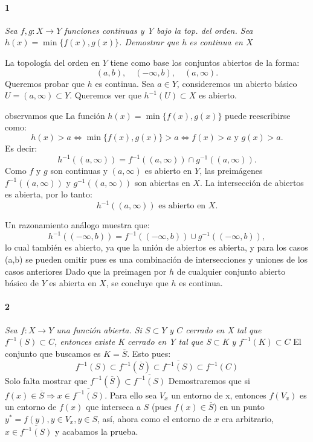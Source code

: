 \documentclass[12pt]{article}
\author{Alumnos: \\Arturo Rodriguez Contreras - 2132880 \\
Jonathan Raymundo Torres Cardenas - 1949731\\
Praxedis Jimenes Ruvalcaba \\
Erick Román Montemayor Treviño - 1957959 \\
Alexis Noe Mora Leyva \\
Everardo Flores Rivera - 2127301}
\begin{document}
\maketitle

\paragraph{1}
\textit{Sea $f,g:X \to Y$ funciones continuas y Y bajo la top. del orden. Sea $h(x)=\min{\{f(x),g(x)\}}$. Demostrar que h es continua en $X$}

La topología del orden en \( Y \) tiene como base los conjuntos abiertos de la forma:
\[
(a, b),\quad (-\infty, b),\quad (a, \infty).
\]
Queremos probar que \( h \) es continua.  
Sea \( a \in Y \), consideremos un abierto básico \( U = (a, \infty) \subset Y \).  
Queremos ver que \( h^{-1}(U) \subset X \) es abierto.

observamos que
La función \( h(x) = \min\{f(x), g(x)\} \) puede reescribirse como:
\[
h(x) > a \iff \min\{f(x), g(x)\} > a \iff f(x) > a \text{ y } g(x) > a.
\]
Es decir:
\[
h^{-1}((a, \infty)) = f^{-1}((a, \infty)) \cap g^{-1}((a, \infty)).
\]
Como \( f \) y \( g \) son continuas y \( (a, \infty) \) es abierto en \( Y \), las preimágenes \( f^{-1}((a, \infty)) \) y \( g^{-1}((a, \infty)) \) son abiertas en \( X \).  
La intersección de abiertos es abierta, por lo tanto:
\[
h^{-1}((a, \infty)) \text{ es abierto en } X.
\]

Un razonamiento análogo muestra que:
\[
h^{-1}((-\infty, b)) = f^{-1}((-\infty, b)) \cup g^{-1}((-\infty, b)),
\]
lo cual también es abierto, ya que la unión de abiertos es abierta, y para los casos  (a,b) se pueden omitir pues es una combinación de intersecciones y uniones de los casos anteriores    
Dado que la preimagen por \( h \) de cualquier conjunto abierto básico de \( Y \) es abierta en \( X \), se concluye que \( h \) es continua.

\paragraph{2}
\textit{Sea $f:X\rightarrow Y$ una función abierta. Si $S \subset Y$ y $C$ cerrado en X tal que $f^{-1}(S)\subset C$, entonces existe K cerrado en Y tal que S$\subset$K y $f^{-1}(K)\subset C$}
El conjunto que buscamos es $K=\overline{S}$. Esto pues:
\begin{equation}
    f^{-1}(S) \subset f^{-1}(\overline{S}) \subset \overline{f^{-1}(S)} \subset f^{-1}(C)
\end{equation}
Solo falta mostrar que $f^{-1}(\overline{S}) \subset \overline{f^{-1}(S)}$
Demostraremos que si $f(x) \in \overline{S} \Rightarrow x \in \overline{f^{-1}(S)}$. Para ello sea $V_{x}$ un entorno de x, entonces $f(V_{x})$ es un entorno de $f(x)$
que interseca a $S$ (pues $f(x) \in \overline{S}$) en un punto $y^{*} = f(y), y \in V_{x}, y \in S$, así, ahora como el entorno de $x$ era arbitrario, $x \in \overline{f^{-1}(S)}$ y acabamos la prueba.
\end{document}
